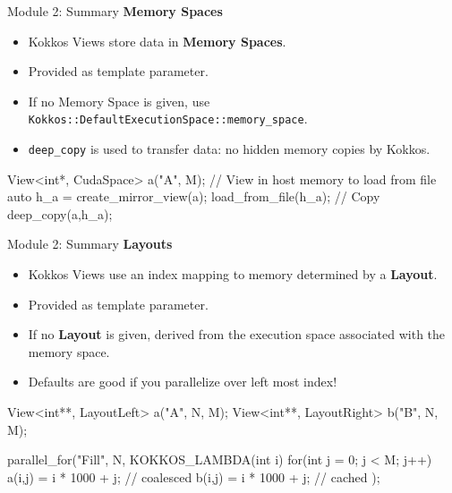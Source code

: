 \begin{frame}[fragile]{Module 2: Summary}
	\textbf{Memory Spaces}
	\begin{itemize}
		\item Kokkos Views store data in \textbf{Memory Spaces}.
		\item Provided as template parameter.
		\item If no Memory Space is given, use  \texttt{Kokkos::DefaultExecutionSpace::memory\_space}.
		\item \texttt{deep\_copy} is used to transfer data: no hidden memory copies by Kokkos.
	\end{itemize}
\begin{code}[keywords={View,int,CudaSpace,create_mirror_view}]
	View<int*, CudaSpace> a("A", M);
	// View in host memory to load from file
	auto h_a = create_mirror_view(a);
        load_from_file(h_a);
	// Copy
	deep_copy(a,h_a);
\end{code}

\end{frame}

\begin{frame}[fragile]{Module 2: Summary}
	\textbf{Layouts}
	\begin{itemize}
		\item Kokkos Views use an index mapping to memory determined by a \textbf{Layout}.
		\item Provided as template parameter.
		\item If no \textbf{Layout} is given, derived from the execution space associated with the memory space.
		\item Defaults are good if you parallelize over left most index!
	\end{itemize}

\begin{code}[keywords={View,int,CudaSpace}]
	View<int**, LayoutLeft> a("A", N, M);
	View<int**, LayoutRight> b("B", N, M);

	parallel_for("Fill", N, KOKKOS_LAMBDA(int i) {
          for(int j = 0; j < M; j++) {
            a(i,j) = i * 1000 + j; // coalesced
	    b(i,j) = i * 1000 + j; // cached
          }
	});
\end{code}

\end{frame}

